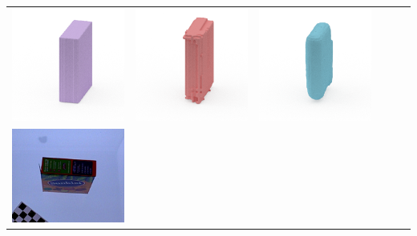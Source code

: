 \documentclass[10pt,onecolumn,letterpaper]{article}
\begin{document}
\begin{tabular}{cccccc}
\includegraphics[height=\turnheight, clip=true, trim=60 30 30 5]{ritz_crackers_NP3_0_bb_view_180.png} &
\includegraphics[height=\turnheight, clip=true, trim=60 30 30 5]{ritz_crackers_NP3_0_zheng_view_180.png} &
\includegraphics[height=\turnheight, clip=true, trim=60 30 30 5]{ritz_crackers_NP3_0_oma_view_180} \\
\includegraphics[height=\turnheight, clip=true, trim=20 30 30 5]{sunkist_fruit_snacks_mixed_fruit.png} &

\end{tabular}
\end{document}
